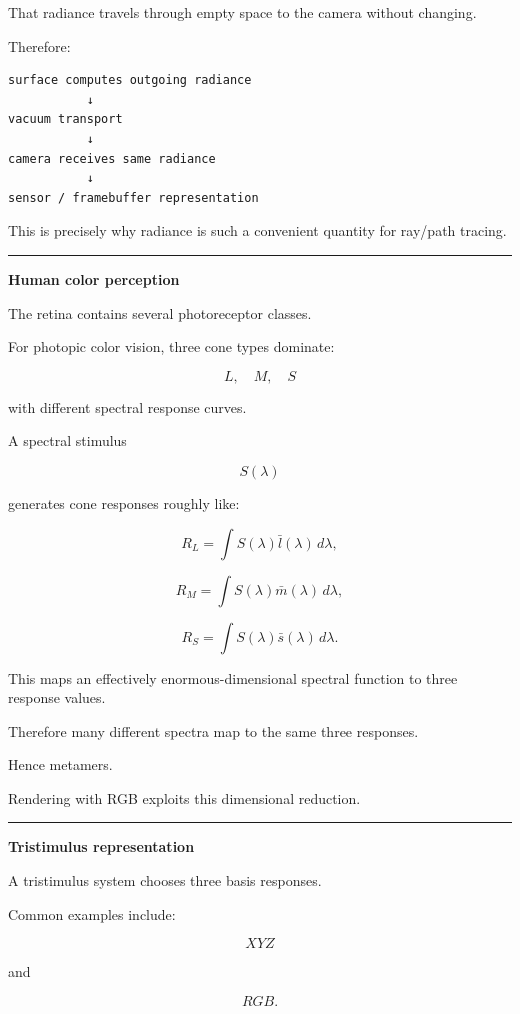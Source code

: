 That radiance travels through empty space to the camera without changing.

Therefore:

\begin{verbatim}
surface computes outgoing radiance
           ↓
vacuum transport
           ↓
camera receives same radiance
           ↓
sensor / framebuffer representation
\end{verbatim}

This is precisely why radiance is such a convenient quantity for ray/path tracing.

\begin{center}\rule{0.5\linewidth}{0.5pt}\end{center}

\textbf{Human color perception}

The retina contains several photoreceptor classes.

For photopic color vision, three cone types dominate:

\[
L,\quad M,\quad S
\]

with different spectral response curves.

A spectral stimulus

\[
S(\lambda)
\]

generates cone responses roughly like:

\[
R_L=
\int S(\lambda)\bar l(\lambda)\,d\lambda,
\]

\[
R_M=
\int S(\lambda)\bar m(\lambda)\,d\lambda,
\]

\[
R_S=
\int S(\lambda)\bar s(\lambda)\,d\lambda.
\]

This maps an effectively enormous-dimensional spectral function to three response values.

Therefore many different spectra map to the same three responses.

Hence metamers.

Rendering with RGB exploits this dimensional reduction.

\begin{center}\rule{0.5\linewidth}{0.5pt}\end{center}

\textbf{Tristimulus representation}

A tristimulus system chooses three basis responses.

Common examples include:

\[
XYZ
\]

and

\[
RGB.
\]

